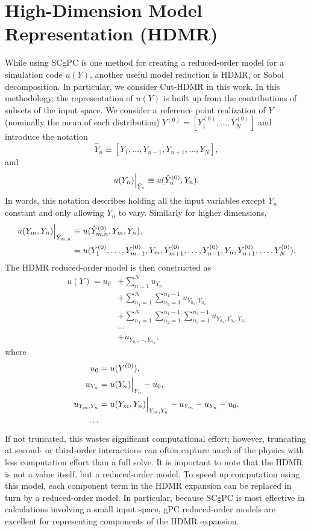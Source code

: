 \section{High-Dimension Model Representation (HDMR)}
While using SCgPC is one method for creating a reduced-order model for a simulation code $u(Y)$, another
useful model reduction is HDMR\cite{hdmr}, or Sobol decomposition.  In particular, we consider Cut-HDMR in this work.  
In this methodology, the representation of $u(Y)$ is built up from the contributions of subsets of the input
space.  We consider a reference point realization of $Y$ (nominally the mean of each distribution) $Y^{(0)} =
[Y_1^{(0)},\ldots,Y_N^{(0)}]$ and introduce the notation
\begin{equation}
  \hat Y_n \equiv [Y_1,\ldots,Y_{n-1},Y_{n+1},\ldots,Y_N],
\end{equation}
and
\begin{equation}
  u(Y_n)\Big|_{\hat Y_n} \equiv u(\hat Y_n^{(0)},Y_n).
\end{equation}
In words, this notation describes holding all the input variables except $Y_n$ constant and only allowing
$Y_n$ to vary.  Similarly for higher dimensions,
\begin{align}
  u(Y_m,Y_n)\Big|_{\hat Y_{m,n}} &\equiv u(\hat Y_{m,n}^{(0)},Y_m,Y_n),\\
      &=
      u(Y_1^{(0)},\ldots,Y_{m-1}^{(0)},Y_m,Y_{m+1}^{(0)},\ldots,Y_{n-1}^{(0)},Y_n,Y_{n+1}^{(0)},\ldots,Y_N^{(0)}).
\end{align}
The HDMR reduced-order model is then constructed as
\begin{align}
  u(Y) = u_0 &+ \sum_{n=1}^N u_{Y_n} \nonumber\\
  &+ \sum_{n_1=1}^N \sum_{n_2=1}^{n_1-1} u_{Y_{n_1},Y_{n_2}} \nonumber \\
  &+ \sum_{n_1=1}^N \sum_{n_2=1}^{n_1-1} \sum_{n_3=1}^{n_2-1} u_{Y_{n_1},Y_{n_2},Y_{n_3}} \nonumber \\
  &\cdots\\
  &+u_{Y_{n_1},\cdots,Y_{n_N}},
\end{align}
where
\begin{align}
  u_0 &= u(Y^{(0)}),\\
  u_{Y_n} &= u(Y_n)\Big|_{Y_n} - u_0,\\
  u_{Y_m,Y_n} &= u(Y_m,Y_n)\Big|_{Y_m,Y_n} - u_{Y_m} - u_{Y_n} - u_0,\\
  \cdots&
\end{align}
If not truncated, this wastes significant computational effort; however, truncating at second- or third-order
interactions can often capture much of the physics with less computation effort than a full solve.  It is
important to note that the HDMR is not a value itself, but a reduced-order model.  To speed up computation
using this model, each component term in the HDMR expansion can be replaced in turn by a reduced-order model.
In particular, because SCgPC is most effective in calculations involving a small input space, gPC
reduced-order models are excellent for representing components of the HDMR expansion.

